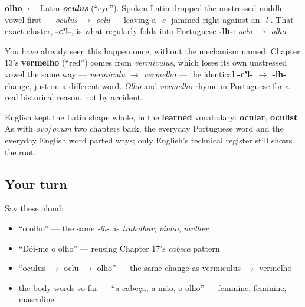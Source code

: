 \begin{cousinweb}
\textbf{olho} $\leftarrow$ Latin \emph{\textbf{oculus}} (\textquotedblleft{}eye\textquotedblright{}). Spoken Latin dropped the unstressed middle vowel first — \emph{oculus $\to$ oclu} — leaving a \emph{-c-} jammed right against an \emph{-l-}. That exact cluster, \textbf{-c'l-}, is what regularly folds into Portuguese \textbf{-lh-}: \emph{oclu $\to$ olho}.

You have already seen this happen once, without the mechanism named: Chapter 13's \textbf{vermelho} (\textquotedblleft{}red\textquotedblright{}) comes from \emph{vermiculus}, which loses its own unstressed vowel the same way — \emph{vermiculu $\to$ vermelho} — the identical \textbf{-c'l- $\to$ -lh-} change, just on a different word. \emph{Olho} and \emph{vermelho} rhyme in Portuguese for a real historical reason, not by accident.

English kept the Latin shape whole, in the \textbf{learned} vocabulary: \textbf{ocular}, \textbf{oculist}. As with \emph{ovo}/\emph{ovum} two chapters back, the everyday Portuguese word and the everyday English word parted ways; only English's technical register still shows the root.
\end{cousinweb}

\subsection*{Your turn}
Say these aloud:

\begin{itemize}
\raggedright
  \item \textquotedblleft{}o olho\textquotedblright{} — the same \emph{-lh-} as \emph{trabalhar}, \emph{vinho}, \emph{mulher}
  \item \textquotedblleft{}Dói-me o olho\textquotedblright{} — reusing Chapter 17's \emph{cabeça} pattern
  \item \textquotedblleft{}oculus $\to$ oclu $\to$ olho\textquotedblright{} — the same change as vermiculus $\to$ vermelho
  \item the body words so far — \textquotedblleft{}a cabeça, a mão, o olho\textquotedblright{} — feminine, feminine, masculine
\end{itemize}

